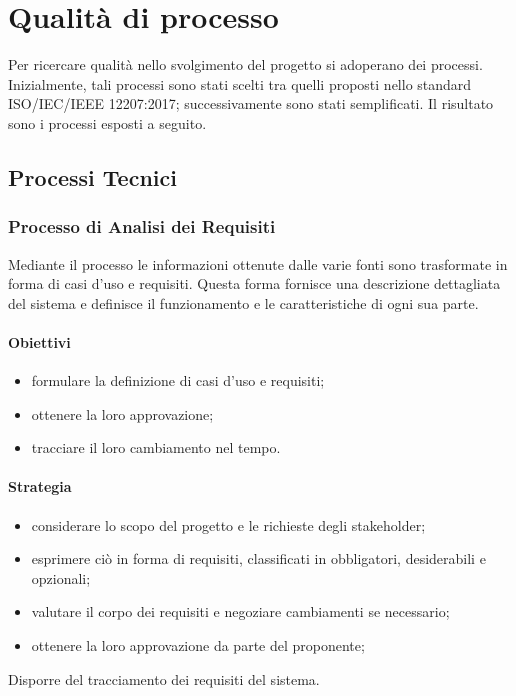 \section{Qualità di processo}
Per ricercare qualità nello svolgimento del progetto si adoperano dei processi. Inizialmente, tali processi sono stati scelti tra quelli proposti nello standard ISO/IEC/IEEE 12207:2017; successivamente sono stati semplificati.\newline 
Il risultato sono i processi esposti a seguito.


\subsection{Processi Tecnici}
	\subsubsection{Processo di Analisi dei Requisiti}
	Mediante il processo le informazioni ottenute dalle varie fonti sono trasformate in forma di casi d'uso e requisiti.
	Questa forma fornisce una descrizione dettagliata del sistema e definisce il funzionamento e le caratteristiche di ogni sua parte.
		\paragraph{Obiettivi}
		\begin{itemize}
			\item formulare la definizione di casi d'uso e requisiti;
			\item ottenere la loro approvazione;
			\item tracciare il loro cambiamento nel tempo.
		\end{itemize}		
		\paragraph{Strategia}
		\begin{itemize}
			\item considerare lo scopo del progetto e le richieste degli stakeholder;
			\item esprimere ciò in forma di requisiti, classificati in obbligatori, desiderabili e opzionali;
			\item valutare il corpo dei requisiti e negoziare cambiamenti se necessario;
			\item ottenere la loro approvazione da parte del proponente;
		\end{itemize}
		Disporre del tracciamento dei requisiti del sistema.
